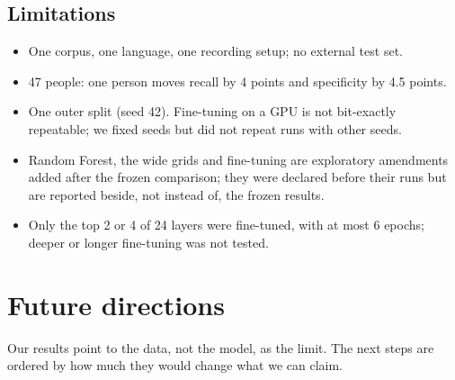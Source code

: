 \documentclass[11pt,a4paper]{article}
\begin{document}
\subsection{Limitations}\label{sec:limitations}
\begin{itemize}\item One corpus, one language, one recording setup; no external test set.
\item 47 people: one person moves recall by 4 points and specificity by 4.5 points.
\item One outer split (seed 42). Fine-tuning on a GPU is not bit-exactly repeatable; we fixed seeds but did not repeat runs with other seeds.
\item Random Forest, the wide grids and fine-tuning are exploratory amendments added after the frozen comparison; they were declared before their runs but are reported beside, not instead of, the frozen results.
\item Only the top 2 or 4 of 24 layers were fine-tuned, with at most 6 epochs; deeper or longer fine-tuning was not tested.
\end{itemize}
\section{Future directions}\label{sec:future}
Our results point to the data, not the model, as the limit. The next steps are ordered by how much they would change what we can claim.
\end{document}
